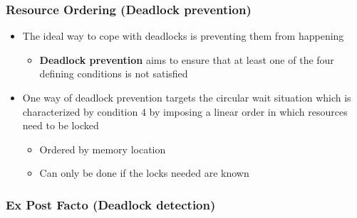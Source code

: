 \documentclass[11pt]{article}
\providecommand{\tightlist}{%
      \setlength{\itemsep}{0pt}\setlength{\parskip}{0pt}}
\begin{document}
    \subsubsection{Resource Ordering (Deadlock
prevention)}\label{resource-ordering-deadlock-prevention}

\begin{itemize}
\tightlist
\item
  The ideal way to cope with deadlocks is preventing them from happening

  \begin{itemize}
  \tightlist
  \item
    \textbf{Deadlock prevention} aims to ensure that at least one of the
    four defining conditions is not satisfied
  \end{itemize}
\item
  One way of deadlock prevention targets the circular wait situation
  which is characterized by condition 4 by imposing a linear order in
  which resources need to be locked

  \begin{itemize}
  \tightlist
  \item
    Ordered by memory location
  \item
    Can only be done if the locks needed are known
  \end{itemize}
\end{itemize}

    \subsubsection{Ex Post Facto (Deadlock
detection)}\label{ex-post-facto-deadlock-detection}
\end{document}
